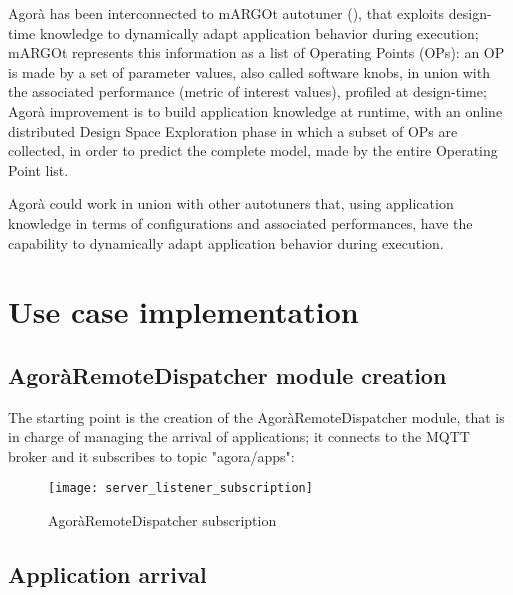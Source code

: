 Agorà has been interconnected to mARGOt autotuner (\cite{gadioli2015application}), that exploits design-time knowledge to dynamically adapt application behavior during execution; mARGOt represents this information as a list of Operating Points (OPs): an OP is made by a set of parameter values, also called software knobs, in union with the associated performance (metric of interest values), profiled at design-time; Agorà improvement is to build application knowledge at runtime, with an online distributed Design Space Exploration phase in which a subset of OPs are collected, in order to predict the complete model, made by the entire Operating Point list.

Agorà could work in union with other autotuners that, using application knowledge in terms of configurations and associated performances, have the capability to dynamically adapt application behavior during execution.










\section{Use case implementation}





\subsection{AgoràRemoteDispatcher module creation}

The starting point is the creation of the AgoràRemoteDispatcher module, that is in charge of managing the arrival of applications; it connects to the MQTT broker and it subscribes to topic "agora/apps":

\begin{figure}[H]

    \centering
    \texttt{[image: server\_listener\_subscription]}
    \caption{AgoràRemoteDispatcher subscription}
    
\end{figure}





\subsection{Application arrival}

